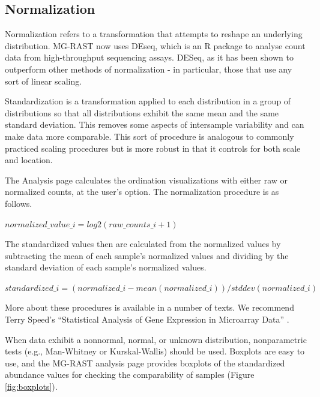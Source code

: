 \documentclass[12pt,fullpage]{report}
\begin{document}
\subsection{Normalization}

Normalization refers to a transformation that attempts to reshape an underlying distribution. MG-RAST now uses DEseq, which is an R package to analyse count data from high-throughput sequencing assays. DESeq, as it has been shown to outperform other methods of normalization - in particular, those that use any sort of linear scaling.


Standardization is a transformation applied to each distribution in a group of distributions so that all distributions exhibit the same mean and the same standard deviation. This removes some aspects of intersample variability and can make data more comparable. This sort of procedure is analogous to commonly practiced scaling procedures but is more robust in that it controls for both scale and location.

The Analysis page calculates the ordination visualizations with either raw or normalized counts, at the user's option. The normalization procedure is
as follows.

\begin{small}
\begin{math}
normalized\_value\_i = log2(raw\_counts\_i + 1)
\end{math}
\end{small}

\noindent
The standardized values then are calculated from the normalized values by subtracting the mean of each sample's normalized values and dividing by the standard deviation of each sample's normalized values.

\begin{small}
\begin{math}
standardized\_i = (normalized\_i - mean(normalized\_i)) / stddev(normalized\_i)
\end{math}
\end{small}

More about these procedures is available in a number of texts. We recommend Terry Speed's ``Statistical Analysis of Gene Expression in Microarray Data'' \cite{1584883278}.

When data exhibit a nonnormal, normal, or unknown distribution, nonparametric tests (e.g., Man-Whitney or Kurskal-Wallis) should be used. Boxplots are easy to use, and the MG-RAST analysis page provides boxplots of the standardized abundance values for checking the comparability of samples (Figure \ref{fig:boxplots}).
\end{document}
